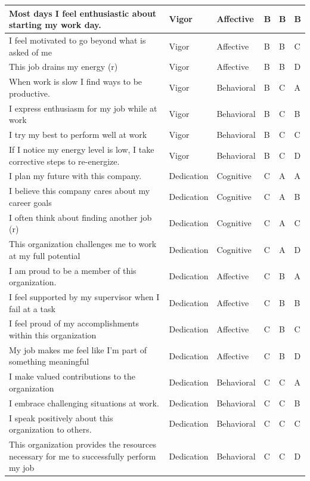 \documentclass[
]{book}
\begin{document}
\begin{table}
\begin{tabular}[t]{l|l|l|l|l|l}
\hline
Most days I feel enthusiastic about starting my work day. & Vigor & Affective & B & B & B\\
\hline
I feel motivated to go beyond what is asked of me & Vigor & Affective & B & B & C\\
\hline
This job drains my energy (r) & Vigor & Affective & B & B & D\\
\hline
When work is slow I find ways to be productive. & Vigor & Behavioral & B & C & A\\
\hline
I express enthusiasm for my job while at work & Vigor & Behavioral & B & C & B\\
\hline
I try my best to perform well at work & Vigor & Behavioral & B & C & C\\
\hline
If I notice my energy level is low, I take corrective steps to re-energize. & Vigor & Behavioral & B & C & D\\
\hline
I plan my future with this company. & Dedication & Cognitive & C & A & A\\
\hline
I believe this company cares about my career goals & Dedication & Cognitive & C & A & B\\
\hline
I often think about finding another job (r) & Dedication & Cognitive & C & A & C\\
\hline
This organization challenges me to work at my full potential & Dedication & Cognitive & C & A & D\\
\hline
I am proud to be a member of this organization. & Dedication & Affective & C & B & A\\
\hline
I feel supported by my supervisor when I fail at a task & Dedication & Affective & C & B & B\\
\hline
I feel proud of my accomplishments within this organization & Dedication & Affective & C & B & C\\
\hline
My job makes me feel like I’m part of something meaningful & Dedication & Affective & C & B & D\\
\hline
I make valued contributions to the organization & Dedication & Behavioral & C & C & A\\
\hline
I embrace challenging situations at work. & Dedication & Behavioral & C & C & B\\
\hline
I speak positively about this organization to others. & Dedication & Behavioral & C & C & C\\
\hline
This organization provides the resources necessary for me to successfully perform my job & Dedication & Behavioral & C & C & D\\
\hline
\end{tabular}
\end{table}
\end{document}
